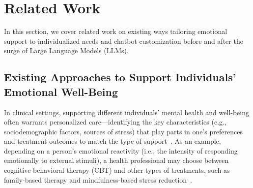 \section{Related Work}
In this section, we cover related work on existing ways tailoring emotional support to individualized needs and chatbot customization before and after the surge of Large Language Models (LLMs).

\subsection{Existing Approaches to Support Individuals' Emotional Well-Being} 

In clinical settings, supporting different individuals' mental health and well-being often warrants personalized care---identifying the key  characteristics (e.g., sociodemographic factors, sources of stress) that play parts in one's preferences and treatment outcomes to match the type of support~\cite{Cuijpers2016Personalized, simon2010personalized, schneider2015state}.
As an example, depending on a person's emotional reactivity (i.e., the intensity of responding emotionally to external stimuli), a health professional may choose between cognitive behavioral therapy (CBT) and other types of treatments, such as family-based therapy and mindfulness-based stress reduction~\cite{schneider2015state}.

